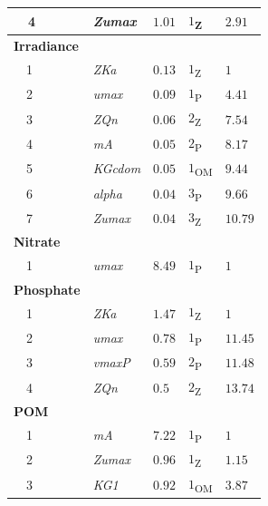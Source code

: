 \documentclass[review]{elsarticle}\usepackage[]{graphicx}\usepackage[]{color}
\begin{document}
\begin{table}[!tbp]
{\begin{center}
\begin{tabular}{lllll}
~~4&\scriptsize{\textit{Zumax}}&$1.01$&$1$\textsubscript{Z}&$2.91$\tabularnewline
\hline
{\bfseries Irradiance}&&&&\tabularnewline
~~1&\scriptsize{\textit{ZKa}}&$0.13$&$1$\textsubscript{Z}&$1$\tabularnewline
~~2&\scriptsize{\textit{umax}}&$0.09$&$1$\textsubscript{P}&$4.41$\tabularnewline
~~3&\scriptsize{\textit{ZQn}}&$0.06$&$2$\textsubscript{Z}&$7.54$\tabularnewline
~~4&\scriptsize{\textit{mA}}&$0.05$&$2$\textsubscript{P}&$8.17$\tabularnewline
~~5&\scriptsize{\textit{KGcdom}}&$0.05$&$1$\textsubscript{OM}&$9.44$\tabularnewline
~~6&\scriptsize{\textit{alpha}}&$0.04$&$3$\textsubscript{P}&$9.66$\tabularnewline
~~7&\scriptsize{\textit{Zumax}}&$0.04$&$3$\textsubscript{Z}&$10.79$\tabularnewline
\hline
{\bfseries Nitrate}&&&&\tabularnewline
~~1&\scriptsize{\textit{umax}}&$8.49$&$1$\textsubscript{P}&$1$\tabularnewline
\hline
{\bfseries Phosphate}&&&&\tabularnewline
~~1&\scriptsize{\textit{ZKa}}&$1.47$&$1$\textsubscript{Z}&$1$\tabularnewline
~~2&\scriptsize{\textit{umax}}&$0.78$&$1$\textsubscript{P}&$11.45$\tabularnewline
~~3&\scriptsize{\textit{vmaxP}}&$0.59$&$2$\textsubscript{P}&$11.48$\tabularnewline
~~4&\scriptsize{\textit{ZQn}}&$0.5$&$2$\textsubscript{Z}&$13.74$\tabularnewline
\hline
{\bfseries POM}&&&&\tabularnewline
~~1&\scriptsize{\textit{mA}}&$7.22$&$1$\textsubscript{P}&$1$\tabularnewline
~~2&\scriptsize{\textit{Zumax}}&$0.96$&$1$\textsubscript{Z}&$1.15$\tabularnewline
~~3&\scriptsize{\textit{KG1}}&$0.92$&$1$\textsubscript{OM}&$3.87$\tabularnewline
\hline
\end{tabular}\end{center}}
\end{table}
\end{document}
